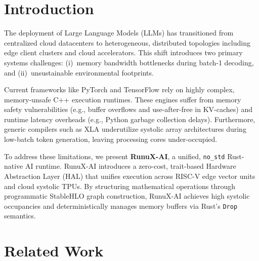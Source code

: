 \documentclass[sigconf,nonacm=false]{acmart}
\begin{document}


\maketitle

\section{Introduction}
\label{sec:intro}

The deployment of Large Language Models (LLMs) has transitioned from centralized cloud datacenters to heterogeneous, distributed topologies including edge client clusters and cloud accelerators. This shift introduces two primary systems challenges: (i)~memory bandwidth bottlenecks during batch-1 decoding, and (ii)~unsustainable environmental footprints.

Current frameworks like PyTorch and TensorFlow rely on highly complex, memory-unsafe C++ execution runtimes. These engines suffer from memory safety vulnerabilities (e.g., buffer overflows and use-after-free in KV-caches) and runtime latency overheads (e.g., Python garbage collection delays). Furthermore, generic compilers such as XLA underutilize systolic array architectures during low-batch token generation, leaving processing cores under-occupied.

To address these limitations, we present \textbf{RunuX-AI}, a unified, \texttt{no\_std} Rust-native AI runtime. RunuX-AI introduces a zero-cost, trait-based Hardware Abstraction Layer (HAL) that unifies execution across RISC-V edge vector units and cloud systolic TPUs. By structuring mathematical operations through programmatic StableHLO graph construction, RunuX-AI achieves high systolic occupancies and deterministically manages memory buffers via Rust's \texttt{Drop} semantics.

\section{Related Work}
\label{sec:related}
\end{document}
